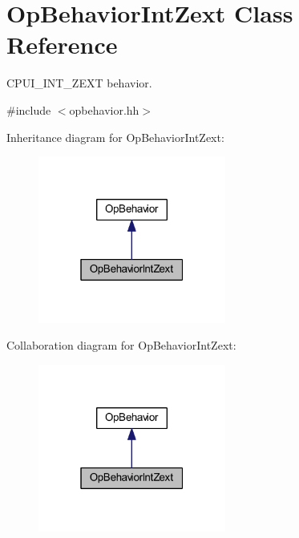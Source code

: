 \hypertarget{class_op_behavior_int_zext}{}\section{Op\+Behavior\+Int\+Zext Class Reference}
\label{class_op_behavior_int_zext}


C\+P\+U\+I\+\_\+\+I\+N\+T\+\_\+\+Z\+E\+XT behavior.  




{\ttfamily \#include $<$opbehavior.\+hh$>$}



Inheritance diagram for Op\+Behavior\+Int\+Zext\+:
\nopagebreak
\begin{figure}[H]
\begin{center}
\leavevmode
\includegraphics[width=175pt]{class_op_behavior_int_zext__inherit__graph}
\end{center}
\end{figure}


Collaboration diagram for Op\+Behavior\+Int\+Zext\+:
\nopagebreak
\begin{figure}[H]
\begin{center}
\leavevmode
\includegraphics[width=175pt]{class_op_behavior_int_zext__coll__graph}
\end{center}
\end{figure}
